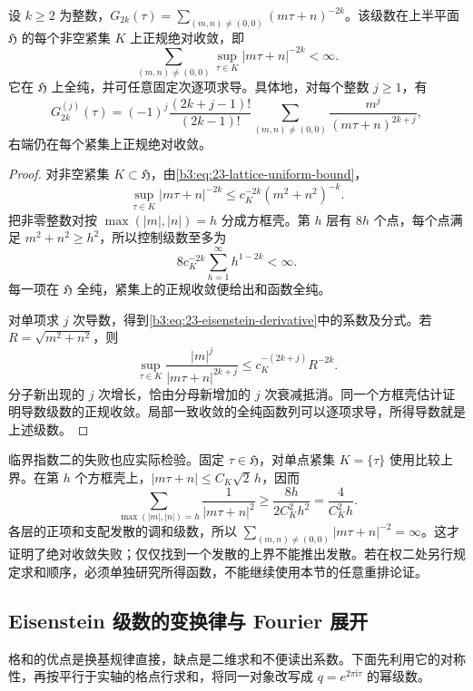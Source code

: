 \begin{proposition}\label{b3:prop:23-eisenstein-convergence}
设 \(k\ge2\) 为整数，\(G_{2k}(\tau)=\sum_{(m,n)\ne(0,0)}(m\tau+n)^{-2k}\)。该级数在上半平面 \(\mathfrak H\) 的每个非空紧集 \(K\) 上正规绝对收敛，即
\[
 \sum_{(m,n)\ne(0,0)}\sup_{\tau\in K}|m\tau+n|^{-2k}<\infty.
\]
它在 \(\mathfrak H\) 上全纯，并可任意固定次逐项求导。具体地，对每个整数 \(j\ge1\)，有
\begin{equation}\label{b3:eq:23-eisenstein-derivative}
 G_{2k}^{(j)}(\tau)=(-1)^j\frac{(2k+j-1)!}{(2k-1)!}
 \sum_{(m,n)\ne(0,0)}\frac{m^j}{(m\tau+n)^{2k+j}},
\end{equation}
右端仍在每个紧集上正规绝对收敛。
\end{proposition}
\begin{proof}
对非空紧集 \(K\subset\mathfrak H\)，由\eqref{b3:eq:23-lattice-uniform-bound}，
\[
 \sup_{\tau\in K}|m\tau+n|^{-2k}
 \le c_K^{-2k}(m^2+n^2)^{-k}.
\]
把非零整数对按 \(\max(|m|,|n|)=h\) 分成方框壳。第 \(h\) 层有 \(8h\) 个点，每个点满足 \(m^2+n^2\ge h^2\)，所以控制级数至多为
\[
 8c_K^{-2k}\sum_{h=1}^{\infty}h^{1-2k}<\infty.
\]
每一项在 \(\mathfrak H\) 全纯，紧集上的正规收敛便给出和函数全纯。

对单项求 \(j\) 次导数，得到\eqref{b3:eq:23-eisenstein-derivative}中的系数及分式。若 \(R=\sqrt{m^2+n^2}\)，则
\[
 \sup_{\tau\in K}\frac{|m|^j}{|m\tau+n|^{2k+j}}
 \le c_K^{-(2k+j)}R^{-2k}.
\]
分子新出现的 \(j\) 次增长，恰由分母新增加的 \(j\) 次衰减抵消。同一个方框壳估计证明导数级数的正规收敛。局部一致收敛的全纯函数列可以逐项求导，所得导数就是上述级数。
\end{proof}

临界指数二的失败也应实际检验。固定 \(\tau\in\mathfrak H\)，对单点紧集 \(K=\{\tau\}\) 使用比较上界。在第 \(h\) 个方框壳上，\(|m\tau+n|\le C_K\sqrt2\,h\)，因而
\[
 \sum_{\max(|m|,|n|)=h}\frac1{|m\tau+n|^2}
 \ge\frac{8h}{2C_K^2h^2}=\frac4{C_K^2h}.
\]
各层的正项和支配发散的调和级数，所以 \(\sum_{(m,n)\ne(0,0)}|m\tau+n|^{-2}=\infty\)。这才证明了绝对收敛失败；仅仅找到一个发散的上界不能推出发散。若在权二处另行规定求和顺序，必须单独研究所得函数，不能继续使用本节的任意重排论证。

\subsection{Eisenstein 级数的变换律与 Fourier 展开}
\label{b3:subsec:230203}

格和的优点是换基规律直接，缺点是二维求和不便读出系数。下面先利用它的对称性，再按平行于实轴的格点行求和，将同一对象改写成 \(q=e^{2\pi\mathrm{i}\tau}\) 的幂级数。

